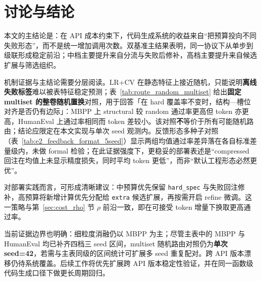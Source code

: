 \section{讨论与结论}

本文的主结论是：在 API 成本约束下，代码生成系统的收益来自“把预算投向不同失败形态”，而不是统一增加调用次数。双基准主结果表明，同一协议下从单步到级联形成稳定前沿；中档主要提升来自分流与失败后修补，高档主要提升来自候选扩展与筛选组织。

机制证据与主结论需要分层阅读。LR+CV 在静态特征上接近随机，只能说明\textbf{离线失败标签}难以被表特征稳定预测；表~\ref{tab:route_random_multiset} 给出\textbf{固定 multiset 的整卷随机置换}对照，用于回答「在 hard 覆盖率不变时，结构—槽位对齐是否仍有边际」：MBPP 上 structural 较 random 通过率更高但 token 亦更高，HumanEval 上通过率相同而 token 差较小。该对照\textbf{不}等价于所有可能随机路由；结论应限定在本文实现与单次 seed 观测内。反馈形态多种子对照（表~\ref{tab:e2_feedback_format_5seed}）显示两组均值通过率差异落在各自标准差量级内，未做 formal 检验；在此证据强度下，更稳妥的部署表述是“compressed 回注在均值上未显示精度损失，同时平均 token 更低”，而非“默认工程形态必然更优”。

对部署实践而言，可形成清晰建议：中预算优先保留 \texttt{hard\_spec} 与失败回注修补，高预算将新增计算优先分配给 \texttt{extra} 候选扩展，再按需开启 refine 微调。这一策略与第~\ref{sec:cost_rho} 节 $\rho$ 前沿一致，即在可接受 token 增量下换取更高通过率。

当前证据边界也明确：细粒度消融仍以 MBPP 为主；尽管主表中的 MBPP 与 HumanEval 均已补齐四档三 seed 区间，multiset 随机路由对照仍为\textbf{单次 seed=42}，若需与主表同级的区间统计可扩展多 seed 重复配对。跨 API 版本漂移仍待系统覆盖。后续工作将优先扩展跨 API 版本稳定性验证，并在同一函数级代码生成口径下做更长周期回归。